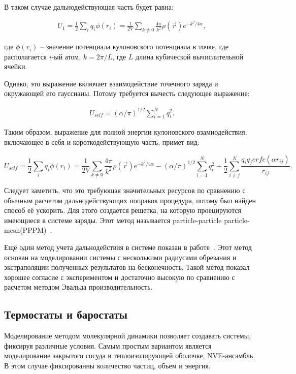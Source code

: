 В таком случае дальнодействующая часть будет равна:

\begin{align}
    U_1 = \frac{1}{2}\sum_{i}q_i \phi(r_i) = \frac{1}{2V}\sum_{k \neq 0} \frac{4\pi}{k^2}\rho(\overrightarrow{r})e^{-k^2/4\alpha},
\end{align}

где $\phi(r_i)$ \--- значение потенциала кулоновского потенциала в точке, где располагается $i$-ый атом, $k = 2\pi/L$, где $L$ длина кубической вычислительной ячейки.

Однако, это выражение включает взаимодействие точечного заряда и окружающей его гауссианы. Потому требуется вычесть следующее выражение:

\begin{align}
    U_{self} = (\alpha/\pi)^{1/2} \sum_{i = 1}^N q_i^2.
\end{align}

Таким образом, выражение для полной энергии кулоновского взамиодействия, включающее в себя и короткодействующую часть, примет вид:

\begin{equation}
    U_{self} = \frac{1}{2}\sum_{i}q_i \phi(r_i) = \frac{1}{2V}\sum_{k \neq 0} \frac{4\pi}{k^2}\rho(\overrightarrow{r})e^{-k^2/4\alpha} - (\alpha/\pi)^{1/2} \sum_{i = 1}^N q_i^2 + \frac{1}{2}\sum_{i \neq j}^N \frac{q_i q_j erfc(\alpha r_{ij})}{r_{ij}}.
\end{equation}

Следует заметить, что это требующая значительных ресурсов по сравнению с обычным расчетом дальнодействующих поправок процедура, потому был найден способ её ускорить. Для этого создается решетка, на которую проецируются имеющиеся в системе заряды. Этот метод называется particle-particle particle-mesh(PPPM)~\cite{eastwood_p3m3dp-three-dimensional_1984}.

Ещё один метод учета дальнодействия в системе показан в работе~\cite{Смирнов__2022}. Этот метод основан на моделировании системы с несколькими радиусами обрезания и экстраполяции полученных результатов на бесконечность. Такой метод показал хорошее согласие с экспериментом и достаточно высокую по сравнению с расчетом методом Эвальда производительность.

\subsection{Термостаты и баростаты}

Моделирование методом молекулярной динамики позволяет создавать системы, фиксируя различные условия. Самым простым вариантом является моделирование закрытого сосуда в теплоизолирующей оболочке, NVE-ансамбль. В этом случае фиксированны количество частиц, объем и энергия. 

